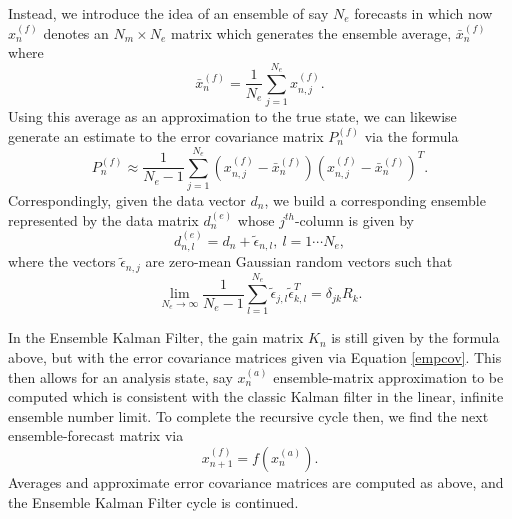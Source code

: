 Instead, we introduce the idea of an ensemble of say $N_{e}$ forecasts in which now $x^{(f)}_{n}$ denotes an $N_{m}\times N_{e}$ matrix which generates the ensemble average, $\bar{x}^{(f)}_{n}$ where
\[
\bar{x}^{(f)}_{n} = \frac{1}{N_{e}}\sum_{j=1}^{N_{e}} x^{(f)}_{n,j}.
\]
Using this average as an approximation to the true state, we can likewise generate an estimate to the error covariance matrix $P^{(f)}_{n}$ via the formula
\begin{equation}
P^{(f)}_{n} \approx \frac{1}{N_{e}-1}\sum_{j=1}^{N_{e}}\left(x^{(f)}_{n,j} - \bar{x}^{(f)}_{n}\right)\left(x^{(f)}_{n,j} - \bar{x}^{(f)}_{n}\right)^{T}.
\label{empcov}
\end{equation}
Correspondingly, given the data vector $d_{n}$, we build a corresponding ensemble represented by the data matrix $d_{n}^{(e)}$ whose $j^{th}$-column is given by 
\[
d^{(e)}_{n,l} = d_{n} + \tilde{\epsilon}_{n,l}, ~ l=1\cdots N_{e},
\]
where the vectors $\tilde{\epsilon}_{n,j}$ are zero-mean Gaussian random vectors such that 
\[
\lim_{N_{e}\rightarrow\infty} \frac{1}{N_{e}-1}\sum_{l=1}^{N_{e}}\tilde{\epsilon}_{j,l}\tilde{\epsilon}_{k,l}^{T} = \delta_{jk}R_{k}. 
\]

In the Ensemble Kalman Filter, the gain matrix $K_{n}$ is still given by the formula above, but with the error covariance matrices given via Equation \eqref{empcov}.  This then allows for an analysis state, say $x^{(a)}_{n}$ ensemble-matrix approximation to be computed which is consistent with the classic Kalman filter in the linear, infinite ensemble number limit.  To complete the recursive cycle then, we find the next ensemble-forecast matrix via
\[
x^{(f)}_{n+1} = f\left(x^{(a)}_{n}\right).
\]
Averages and approximate error covariance matrices are computed as above, and the Ensemble Kalman Filter cycle is continued.  

